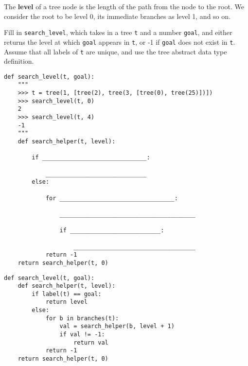\question
The \textbf{level} of a tree node is the length of the path from the node to the root. We consider the root to be level 0, its immediate branches as level 1, and so on.

Fill in \lstinline{search_level}, which takes in a tree \lstinline{t} and a number \lstinline{goal}, and either returns the level at which \lstinline{goal} appears in \lstinline{t}, or -1 if \lstinline{goal} does not exist in \lstinline{t}. Assume that all labels of \lstinline{t} are unique, and use the tree abstract data type definition.

\begin{lstlisting}
def search_level(t, goal):
    """
    >>> t = tree(1, [tree(2), tree(3, [tree(0), tree(25)])])
    >>> search_level(t, 0)
    2
    >>> search_level(t, 4)
    -1
    """
    def search_helper(t, level):

        if ______________________________:

            _____________________________
        else:

            for _________________________________:

                _______________________________________

                if __________________________:

                    ___________________________________
            return -1
    return search_helper(t, 0)
\end{lstlisting}

\begin{solution}
\begin{lstlisting}
def search_level(t, goal):
    def search_helper(t, level):
        if label(t) == goal:
            return level
        else:
            for b in branches(t):
                val = search_helper(b, level + 1)
                if val != -1:
                    return val
            return -1
    return search_helper(t, 0)
\end{lstlisting}
\end{solution}
